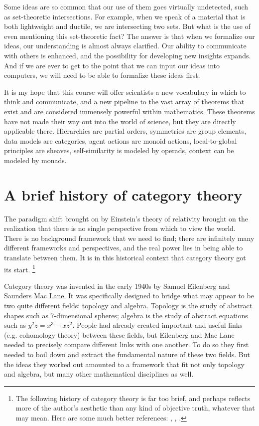 \documentclass{book}
\theoremstyle{remark}
\theoremstyle{definition}
\begin{document}
Some ideas are so common that our use of them goes virtually undetected, such as set-theoretic intersections. For example, when we speak of a material that is both lightweight and ductile, we are intersecting two sets. But what is the use of even mentioning this set-theoretic fact? The answer is that when we formalize our ideas, our understanding is almost always clarified. Our ability to communicate with others is enhanced, and the possibility for developing new insights expands. And if we are ever to get to the point that we can input our ideas into computers, we will need to be able to formalize these ideas first.

It is my hope that this course will offer scientists a new vocabulary in which to think and communicate, and a new pipeline to the vast array of theorems that exist and are considered immensely powerful within mathematics. These theorems have not made their way out into the world of science, but they are directly applicable there. Hierarchies are partial orders, symmetries are group elements, data models are categories, agent actions are monoid actions, local-to-global principles are sheaves, self-similarity is modeled by operads, context can be modeled by monads.


\section{A brief history of category theory}

The paradigm shift brought on by Einstein's theory of relativity brought on the realization that there is no single perspective from which to view the world. There is no background framework that we need to find; there are infinitely many different frameworks and perspectives, and the real power lies in being able to translate between them. It is in this historical context that category theory got its start.
\footnote{The following history of category theory is far too brief, and perhaps reflects more of the author's aesthetic than any kind of objective truth, whatever that may mean. Here are some much better references: \cite{Kro}, \cite{Mar1}, \cite{LM}.}

Category theory was invented in the early 1940s by Samuel Eilenberg and Saunders Mac Lane. It was specifically designed to bridge what may appear to be two quite different fields: topology and algebra. Topology is the study of abstract shapes such as 7-dimensional spheres; algebra is the study of abstract equations such as $y^2z=x^3-xz^2$. People had already created important and useful links (e.g. cohomology theory) between these fields, but Eilenberg and Mac Lane needed to precisely compare different links with one another. To do so they first needed to boil down and extract the fundamental nature of these two fields. But the ideas they worked out amounted to a framework that fit not only topology and algebra, but many other mathematical disciplines as well.
\end{document}
